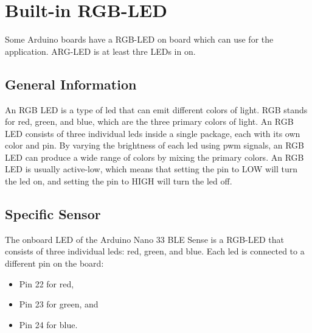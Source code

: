 %
%
%






\chapter{Built-in RGB-LED}

Some Arduino boards have a RGB-LED on board which can use for the application. ARG-LED is at least thre LEDs in on.

\section{General Information}

An RGB LED is a type of \ac{led} that can emit different colors of light. RGB stands for red, green, and blue, which are the three primary colors of light. An RGB LED consists of three individual \ac{led}s inside a single package, each with its own color and pin. By varying the brightness of each \ac{led} using \ac{pwm} signals, an RGB LED can produce a wide range of colors by mixing the primary colors. An RGB LED is usually active-low, which means that setting the pin to LOW will turn the \ac{led} on, and setting the pin to HIGH will turn the \ac{led} off. \cite{Bernstein:2018,Hering:2021,Karvinen:2014}


\section{Specific Sensor}

The onboard LED of the Arduino Nano 33 BLE Sense is a RGB-LED that consists of three individual \ac{led}s: red, green, and blue. Each \ac{led} is connected to a different pin on the board:

\begin{itemize}
    \item Pin 22 for red,
    \item Pin 23 for green, and 
    \item Pin 24 for blue.
\end{itemize} 




